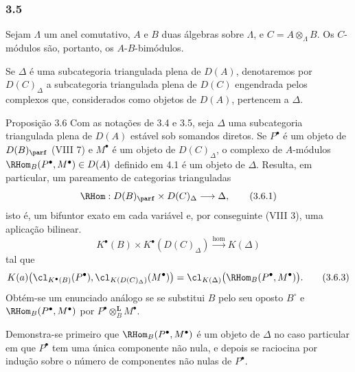 \subsubsection*{3.5}

Sejam $\Lambda$ um anel comutativo, $A$ e $B$ duas álgebras sobre $\Lambda$, e $C=A\otimes_{\Lambda}B$. Os $C$-módulos são, portanto, os $A$-$B$-bimódulos.

Se $\Delta$ é uma subcategoria triangulada plena de $D(A)$, denotaremos por $D(C)_{\Delta}$ a subcategoria triangulada plena de $D(C)$ engendrada pelos complexos que, considerados como objetos de $D(A)$, pertencem a $\Delta$.

\begin{statement}{Proposição 3.6}
Com as notações de 3.4 e 3.5, seja $\Delta$ uma subcategoria triangulada plena de $D(A)$ estável sob somandos diretos. Se $P^\bullet$ é um objeto de $D(B)_{\parf}$ (VIII 7) e $M^\bullet$ é um objeto de $D(C)_{\Delta}$, o complexo de $A$-módulos $\RHom_B(P^\bullet,M^\bullet)\in D(A)$ definido em 4.1 é um objeto de $\Delta$. Resulta, em particular, um pareamento de categorias trianguladas
\[
\RHom:D(B)_{\parf}\times D(C)_{\Delta}\longrightarrow \Delta,
\tag{3.6.1}
\]
isto é, um bifuntor exato em cada variável e, por conseguinte (VIII 3), uma aplicação bilinear.
\[
K^{\bullet}(B)\times K^{\bullet}(D(C)_{\Delta})\xrightarrow{\operatorname{hom}} K(\Delta)
\tag{3.6.2}
\]
tal que
\[
K(a)\bigl(\cl_{K^{\bullet}(B)}(P^\bullet),\cl_{K(D(C)_{\Delta})}(M^\bullet)\bigr)
=\cl_{K(\Delta)}\bigl(\RHom_B(P^\bullet,M^\bullet)\bigr).
\tag{3.6.3}
\]
Obtém-se um enunciado análogo se se substitui $B$ pelo seu oposto $B^\circ$ e $\RHom_B(P^\bullet,M^\bullet)$ por $P^\bullet\otimes_B^{\mathbf L}M^\bullet$.
\end{statement}

\begin{prooftext}[Demonstração]
Demonstra-se primeiro que $\RHom_B(P^\bullet,M^\bullet)$ é um objeto de $\Delta$ no caso particular em que $P^\bullet$ tem uma única componente não nula, e depois se raciocina por indução sobre o número de componentes não nulas de $P^\bullet$.
\end{prooftext}
